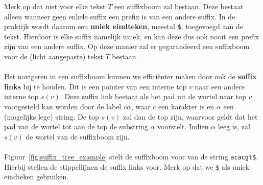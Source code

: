 Merk op dat niet voor elke tekst $T$ een suffixboom zal bestaan.
Deze bestaat alleen wanneer geen enkele suffix een prefix is van een andere suffix.
In de praktijk wordt daarom een \textbf{uniek eindteken}, meestal \texttt{\$}, toegevoegd aan de tekst.
Hierdoor is elke suffix namelijk uniek, en kan deze dus ook nooit een prefix zijn van een andere suffix.
Op deze manier zal er gegarandeerd een suffixboom voor de (licht aangepaste) tekst $T$ bestaan.
\\ \\
Het navigeren in een suffixboom kunnen we efficiënter maken door ook de \textbf{suffix links} bij te houden.
Dit is een pointer van een interne top $v$ naar een andere interne top $s(v)$.
Deze suffix link bestaat als het pad uit de wortel naar top $v$ voorgesteld kan worden door de label $c\alpha$, waar $c$ een karakter is en $\alpha$ een (mogelijks lege) string.
De top $s(v)$ zal dan de top zijn, waarvoor geldt dat het pad van de wortel tot aan de top de substring $\alpha$ voorstelt.
Indien $\alpha$ leeg is, zal $s(v)$ de wortel van de suffixboom zijn.
\\ \\
Figuur~\ref{fig:suffix_tree_example} stelt de suffixboom voor van de string \texttt{acacgt\$}.
Hierbij stellen de stippellijnen de suffix links voor.
Merk op dat we \texttt{\$} als uniek eindteken gebruiken.


